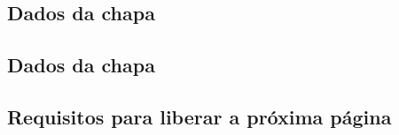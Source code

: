 \thispagestyle{fancy}
\vspace{\fill}
\subsection{\small Dados da chapa}
\begin{figure}
    \centering
    
\end{figure}
\newpage

\thispagestyle{fancy}
\vspace{\fill}
\subsection{\small Dados da chapa}
\begin{figure}
    \centering
    
\end{figure}
\newpage

\thispagestyle{fancy}
\vspace{\fill}
\subsection{\small Requisitos para liberar a próxima página}
\begin{figure}
    \centering
    
\end{figure}

